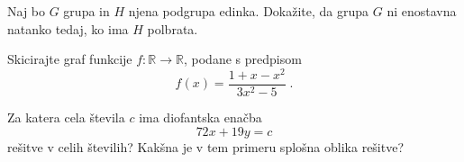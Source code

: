 \documentclass{izpit}
\begin{document}
  \prostor[2] %

  \podnaloga[10]
    Naj bo $G$ grupa in $H$ njena podgrupa edinka. Dokažite, da grupa $G$ ni
    enostavna natanko tedaj, ko ima $H$ polbrata.

  \prostor

\naloga[\tocke{25}]
  Skicirajte graf funkcije $f \colon \mathbb{R} \to \mathbb{R}$, podane s
  predpisom
  \[
    f(x) = \frac{1 + x - x^2}{3 x^2 - 5} \;.
  \]



  Za katera cela števila $c$ ima diofantska enačba
  \[
    72 x + 19 y = c
  \]
  rešitve v celih številih? Kakšna je v tem primeru splošna oblika rešitve?
\end{document}
